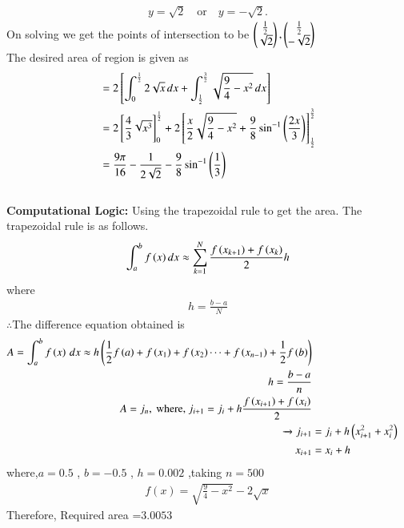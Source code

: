 \documentclass[journal]{IEEEtran}
\numberwithin{equation}{enumi}
\numberwithin{figure}{enumi}
\begin{document}
\begin{align}
y = \sqrt{2} \quad \text{or} \quad y = -\sqrt{2}.
\end{align}
On solving we get the points of intersection to be $\begin{pmatrix}\frac{1}{2}\\\sqrt{2}\end{pmatrix}, \begin{pmatrix}\frac{1}{2}\\-\sqrt{2}\end{pmatrix}$\\
The desired area of region is given as\\
\begin{align*}
&= 2{}\left[\int_{0}^{\frac{1}{2}} 2\sqrt{x} \, dx + \int_{\frac{1}{2}}^{\frac{3}{2}} \sqrt{\frac{9}{4}-x^2} \, dx\right]\\
&= 2{}\left[\frac{4}{3}\sqrt{x^3}\right]_0^\frac{1}{2} + 2{}\left[\frac{x}{2}\sqrt{\frac{9}{4}-x^2} + \frac{9}{8}\sin^{-1}\left(\frac{2x}{3}\right)\right]_\frac{1}{2}^\frac{3}{2}\\
&= \frac{9\pi}{16}-\frac{1}{2\sqrt{2}}-\frac{9}{8}\sin^{-1}\left(\frac{1}{3}\right)
\end{align*}\\
	
\textbf{Computational Logic:} 
Using the trapezoidal rule to get the area. The trapezoidal rule is as follows.
\begin{align}
\int^{b}_{a} f\left(x\right)dx\approx \sum^{N}_{k=1}\frac{f\left(x_{k+1}\right)+f\left(x_{k}\right)}{2}h
\end{align}
where
\begin{align}
h=\frac{b-a}{N}
\end{align}
$\therefore$The difference equation obtained is\\
\begin{align}
A = \int_a^b f\left(x\right)\, dx \approx h\left(\frac{1}{2}f\left(a\right) + f\left(x_1\right) + f\left(x_2\right) \cdots + f\left(x_{n-1}\right) + \frac{1}{2}f\left(b\right)\right)\\
h = \frac{b-a}{n}\\
A = j_n, \text{ where, } j_{i + 1} = j_i + h\frac{f\left(x_{i+1}\right) + f\left(x_i\right)}{2}\\ 
\xrightarrow{} j_{i + 1} &= j_i + h\left({x_{i+1}^2}+{x_{i}^2}\right)\\
x_{i+1} &= x_i + h\\
\end{align}	
where,$a=0.5$ , $b=-0.5$ , $h=0.002$ ,taking $n=500$\\
\begin{align}
f(x) = \sqrt{\frac{9}{4} - x^2} - 2\sqrt{x}
\end{align}
Therefore, Required area =$3.0053$
	
\end{document}
